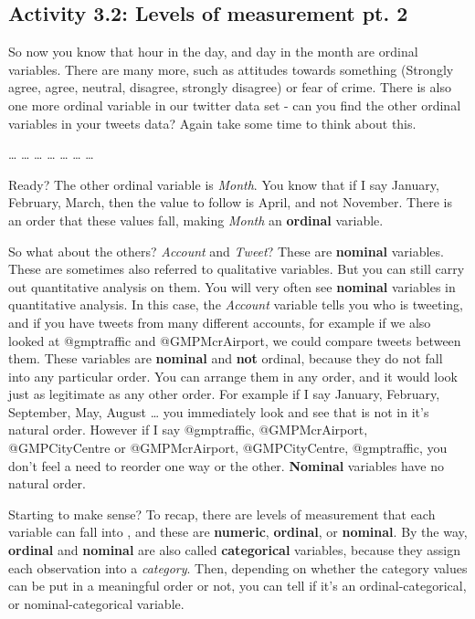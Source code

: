 \documentclass[]{book}
\theoremstyle{definition}
\theoremstyle{definition}
\theoremstyle{definition}
\theoremstyle{remark}
\begin{document}
\hypertarget{activity-3.2-levels-of-measurement-pt.-2}{%
\subsection{Activity 3.2: Levels of measurement pt.
2}\label{activity-3.2-levels-of-measurement-pt.-2}}

{ So now you know that hour in the day, and day in the month are ordinal
variables. There are many more, such as attitudes towards something
(Strongly agree, agree, neutral, disagree, strongly disagree) or fear of
crime. There is also one more ordinal variable in our twitter data set -
can you find the other ordinal variables in your tweets data? Again take
some time to think about this. }

\ldots{} \ldots{} \ldots{} \ldots{} \ldots{} \ldots{} \ldots{}

Ready? The other ordinal variable is \emph{Month}. You know that if I
say January, February, March, then the value to follow is April, and not
November. There is an order that these values fall, making \emph{Month}
an \textbf{ordinal} variable.

So what about the others? \emph{Account} and \emph{Tweet}? These are
\textbf{nominal} variables. These are sometimes also referred to
qualitative variables. But you can still carry out quantitative analysis
on them. You will very often see \textbf{nominal} variables in
quantitative analysis. In this case, the \emph{Account} variable tells
you who is tweeting, and if you have tweets from many different
accounts, for example if we also looked at @gmptraffic and
@GMPMcrAirport, we could compare tweets between them. These variables
are \textbf{nominal} and \textbf{not} ordinal, because they do not fall
into any particular order. You can arrange them in any order, and it
would look just as legitimate as any other order. For example if I say
January, February, September, May, August \ldots{} you immediately look
and see that is not in it's natural order. However if I say @gmptraffic,
@GMPMcrAirport, @GMPCityCentre or @GMPMcrAirport, @GMPCityCentre,
@gmptraffic, you don't feel a need to reorder one way or the other.
\textbf{Nominal} variables have no natural order.

Starting to make sense? To recap, there are levels of measurement that
each variable can fall into , and these are \textbf{numeric},
\textbf{ordinal}, or \textbf{nominal}. By the way, \textbf{ordinal} and
\textbf{nominal} are also called \textbf{categorical} variables, because
they assign each observation into a \emph{category}. Then, depending on
whether the category values can be put in a meaningful order or not, you
can tell if it's an ordinal-categorical, or nominal-categorical
variable.
\end{document}
